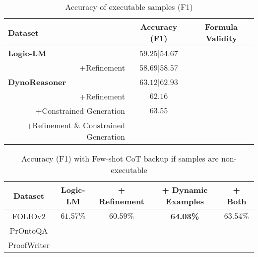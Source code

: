 \documentclass[conference]{IEEEtran}
\begin{document}
\begin{table*}[t]
    \centering
    \begin{tabular}{|l|c|c|}
    \hline
    \textbf{Dataset}                                                            & \multicolumn{1}{c|}{Accuracy (F1)} & \multicolumn{1}{c|}{Formula Validity}  \\ \hline
    \textbf{Logic-LM}                                                           & $59.25$|$54.67$      &    \\ 
    \multicolumn{1}{|r|}{+Refinement}                                           & $58.69$|$58.57$      &    \\ \hline  
    \textbf{DynoReasoner}                                                       & $63.12$|$62.93$      &    \\ 
    \multicolumn{1}{|r|}{\hspace{1cm}+Refinement}                               & $62.16$                &    \\ 
    \multicolumn{1}{|r|}{\hspace{1cm}+Constrained Generation}                   & $63.55$                &    \\ 
    \multicolumn{1}{|r|}{\hspace{1cm}+Refinement \& Constrained Generation}     &                          &    \\ \hline
\end{tabular}
\caption{Accuracy of executable samples (F1)}    
\end{table*}

\begin{table*}[t]
    \centering
    \begin{tabular}{|c|c|c|c|c|}
    \hline
    \textbf{Dataset}                    & \textbf{Logic-LM}       & \textbf{+ Refinement}     &      \textbf{+ Dynamic Examples}  & \textbf{+ Both}             \\ \hline
    FOLIOv2                             &      $61.57\%$           &     $60.59\%$             &      \textbf{64.03\%}                      &           $63.54\%$        \\ \hline
    PrOntoQA                            &                          &                           &                                     &                          \\ \hline
    ProofWriter                         &                          &                           &                                     &                          \\ \hline
\end{tabular}
\caption{Accuracy (F1) with Few-shot CoT backup if samples are non-executable}    
\end{table*}
\end{document}
